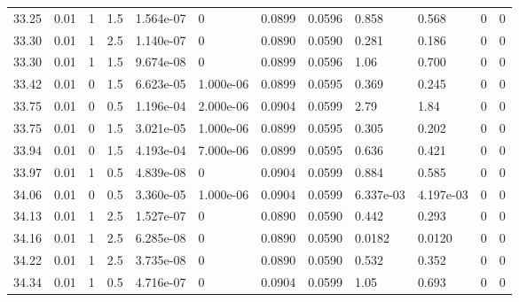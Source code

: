 \documentclass[preview]{standalone}
\begin{document}
{{{{{{\begin{tabular}{L{1.2cm}C{1.2cm} C{0.3cm}C{0.5cm} C{1.4cm}C{1.4cm} C{1.4cm}C{1.4cm} C{1.6cm}C{1.6cm} C{1.6cm}C{1.6cm}}
  33.25  &  0.01  & 1     & 1.5 &  1.564e-07  & 0  &  0.0899&   0.0596& 0.858 & 0.568   &  0 & 0  \\ 
  33.30  &  0.01  & 1     & 2.5 &  1.140e-07  & 0  &  0.0890&   0.0590& 0.281 & 0.186   &  0 & 0  \\ 
  33.30  &  0.01  & 1     & 1.5 &  9.674e-08  & 0  &  0.0899&   0.0596& 1.06 & 0.700   &  0 & 0  \\ 
  33.42  &  0.01  & 0     & 1.5 &  6.623e-05  & 1.000e-06  &  0.0899&   0.0595& 0.369 & 0.245   &  0 & 0  \\ 
  33.75  &  0.01  & 0     & 0.5 &  1.196e-04  & 2.000e-06  &  0.0904&   0.0599& 2.79 & 1.84   &  0 & 0  \\ 
  33.75  &  0.01  & 0     & 1.5 &  3.021e-05  & 1.000e-06  &  0.0899&   0.0595& 0.305 & 0.202   &  0 & 0  \\ 
  33.94  &  0.01  & 0     & 1.5 &  4.193e-04  & 7.000e-06  &  0.0899&   0.0595& 0.636 & 0.421   &  0 & 0  \\ 
  33.97  &  0.01  & 1     & 0.5 &  4.839e-08  & 0  &  0.0904&   0.0599& 0.884 & 0.585   &  0 & 0  \\ 
  34.06  &  0.01  & 0     & 0.5 &  3.360e-05  & 1.000e-06  &  0.0904&   0.0599& 6.337e-03 & 4.197e-03   &  0 & 0  \\ 
  34.13  &  0.01  & 1     & 2.5 &  1.527e-07  & 0  &  0.0890&   0.0590& 0.442 & 0.293   &  0 & 0  \\ 
  34.16  &  0.01  & 1     & 2.5 &  6.285e-08  & 0  &  0.0890&   0.0590& 0.0182 & 0.0120   &  0 & 0  \\ 
  34.22  &  0.01  & 1     & 2.5 &  3.735e-08  & 0  &  0.0890&   0.0590& 0.532 & 0.352   &  0 & 0  \\ 
  34.34  &  0.01  & 1     & 0.5 &  4.716e-07  & 0  &  0.0904&   0.0599& 1.05 & 0.693   &  0 & 0  \\ 
\hline 
\end{tabular} 

}}}}}}
\end{document}
